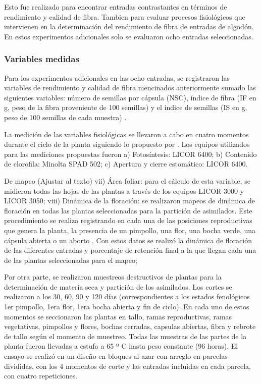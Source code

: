 \documentclass[12pt,oneside]{reedthesis}
\begin{document}
Esto fue realizado para encontrar entradas contrastantes en términos de rendimiento y calidad de fibra. Tambien para evaluar procesos fisiológicos que intervienen en la determinación del rendimiento de fibra de entradas de algodón. En estos experimentos adicionales solo se evaluaron ocho entradas seleccionadas.

\subsubsection{Variables medidas}\label{variables-medidas-1}

Para los experimentos adicionales en las ocho entradas, se registraron las variables de rendimiento y calidad de fibra mencinados anteriormente sumado las siguientes variables: número de semillas por cápsula (NSC)\autocite{worley1974}, índice de fibra (IF en g, peso de la fibra proveniente de 100 semillas) y el índice de semillas (IS en g, peso de 100 semillas de cada muestra) \autocite{pettigrew2013}.

La medición de las variables fisiológicas se llevaron a cabo en cuatro momentos durante el ciclo de la planta siguiendo lo propuesto por \autocite{luo2017}. Los equipos utilizados para las mediciones propuestas fueron a) Fotosíntesis: LICOR 6400; b) Contenido de clorofila: Minolta SPAD 502; c) Apertura y cierre estomático: LICOR 6400.

De mapeo (Ajustar al texto) vii) Área foliar: para el cálculo de esta variable, se midieron todas las hojas de las plantas a través de los equipos LICOR 3000 y LICOR 3050; viii) Dinámica de la floración: se realizaron mapeos de dinámica de floración en todas las plantas seleccionadas para la partición de asimilados. Este procedimiento se realiza registrando en cada una de las posiciones reproductivas que genera la planta, la presencia de un pimpollo, una flor, una bocha verde, una cápsula abierta o un aborto \autocite{kerby1996monitoring}. Con estos datos se realizó la dinámica de floración de las diferentes entradas y porcentaje de retención final a la que llegan cada una de las plantas seleccionadas para el mapeo;

Por otra parte, se realizaron muestreos destructivos de plantas para la determinación de materia seca y partición de los asimilados. Los cortes se realizaron a los 30, 60, 90 y 120 días (correspondientes a los estados fenológicos 1er pimpollo, 1era flor, 1era bocha abierta y fin de ciclo). En cada uno de estos momentos se seccionaron las plantas en tallo, ramas reproductivas, ramas vegetativas, pimpollos y flores, bochas cerradas, capsulas abiertas, fibra y rebrote de tallo según el momento de muestreo. Todas las muestras de las partes de la planta fueron llevadas a estufa a 65 º C hasta peso constante (96 horas). El ensayo se realizó en un diseño en bloques al azar con arreglo en parcelas divididas, con los 4 momentos de corte y las entradas incluidas en cada parcela, con cuatro repeticiones.
\end{document}
